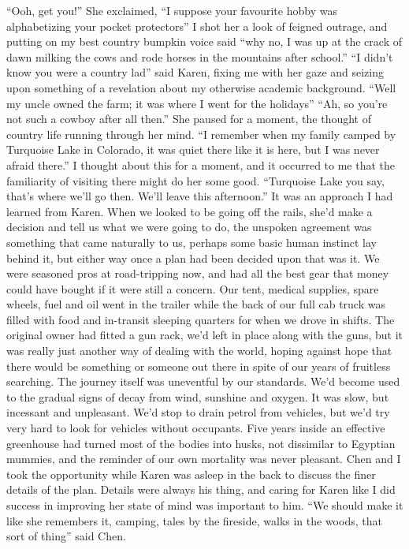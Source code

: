 \documentclass[a4paper]{article}
\begin{document}
“Ooh, get you!” She exclaimed, “I suppose your favourite hobby was alphabetizing your pocket protectors”
I shot her a look of feigned outrage, and putting on my best country bumpkin voice said “why no, I was up at the crack of dawn milking the cows and rode horses in the mountains after school.”
“I didn’t know you were a country lad” said Karen, fixing me with her gaze and seizing upon something of a revelation about my otherwise academic background.
“Well my uncle owned the farm; it was where I went for the holidays”
“Ah, so you’re not such a cowboy after all then.” She paused for a moment, the thought of country life running through her mind. “I remember when my family camped by Turquoise Lake in Colorado, it was quiet there like it is here, but I was never afraid there.”
I thought about this for a moment, and it occurred to me that the familiarity of visiting there might do her some good. “Turquoise Lake you say, that’s where we’ll go then. We’ll leave this afternoon.”
It was an approach I had learned from Karen. When we looked to be going off the rails, she’d make a decision and tell us what we were going to do, the unspoken agreement was something that came naturally to us, perhaps some basic human instinct lay behind it, but either way once a plan had been decided upon that was it.
We were seasoned pros at road-tripping now, and had all the best gear that money could have bought if it were still a concern. Our tent, medical supplies, spare wheels, fuel and oil went in the trailer while the back of our full cab truck was filled with food and in-transit sleeping quarters for when we drove in shifts. The original owner had fitted a gun rack, we’d left in place along with the guns, but it was really just another way of dealing with the world, hoping against hope that there would be something or someone out there in spite of our years of fruitless searching.
The journey itself was uneventful by our standards. We’d become used to the gradual signs of decay from wind, sunshine and oxygen. It was slow, but incessant and unpleasant. We’d stop to drain petrol from vehicles, but we’d try very hard to look for vehicles without occupants. Five years inside an effective greenhouse had turned most of the bodies into husks, not dissimilar to Egyptian mummies, and the reminder of our own mortality was never pleasant.
Chen and I took the opportunity while Karen was asleep in the back to discuss the finer details of the plan. Details were always his thing, and caring for Karen like I did success in improving her state of mind was important to him.
“We should make it like she remembers it, camping, tales by the fireside, walks in the woods, that sort of thing” said Chen.
\end{document}
